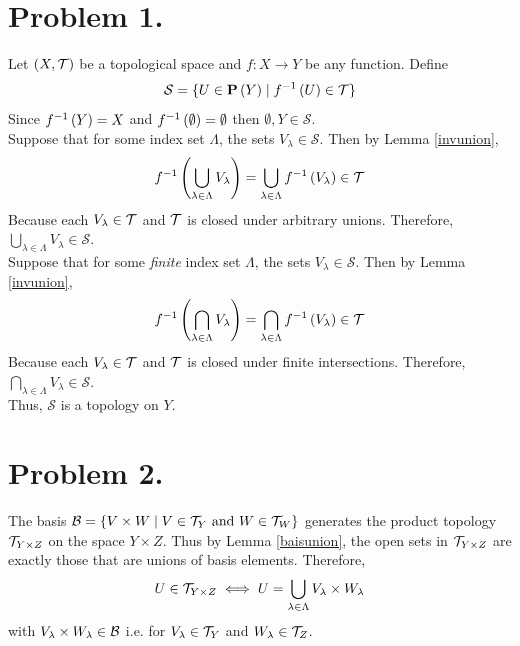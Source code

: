 \documentclass[12pt]{extarticle}
\begin{document}
 
\section*{Problem 1.}
Let $(X, \mathcal{T})$ be a topological space and $f : X \rightarrow Y$ be any function. Define \[\mathcal{S} = \{ U \in \mathbf{P}\left(Y\right) \mid f^{-1} \left( U \right) \in \mathcal{T} \}\]
Since $f^{-1} \left( Y \right) = X$ and $f^{-1} \left( \emptyset \right) = \emptyset$ then $\emptyset, Y \in \mathcal{S}$. \\ \smallskip
Suppose that for some index set $\Lambda$, the sets $V_\lambda \in \mathcal{S}$. Then by Lemma \ref{invunion}, \[f^{-1} \left( \bigcup_{\lambda \in \Lambda} V_\lambda \right) = \bigcup_{\lambda \in \Lambda} f^{-1} \left( V_\lambda \right) \in \mathcal{T}\]
Because each $V_\lambda \in \mathcal{T}$ and $\mathcal{T}$ is closed under arbitrary unions. Therefore, $\bigcup\limits_{\lambda \in \Lambda} V_\lambda \in \mathcal{S}$. \\
Suppose that for some \emph{finite} index set $\Lambda$, the sets $V_\lambda \in \mathcal{S}$. Then by Lemma \ref{invunion}, \[f^{-1} \left( \bigcap_{\lambda \in \Lambda} V_\lambda \right) = \bigcap_{\lambda \in \Lambda} f^{-1} \left( V_\lambda \right) \in \mathcal{T}\]
Because each $V_\lambda \in \mathcal{T}$ and $\mathcal{T}$ is closed under finite intersections. Therefore, $\bigcap\limits_{\lambda \in \Lambda} V_\lambda \in \mathcal{S}$. \\
Thus, $\mathcal{S}$ is a topology on $Y$. 

\section*{Problem 2.}
The basis $\mathcal{B} = \{V \times W \mid V \in \mathcal{T}_Y \text{ and } W \in \mathcal{T}_W \}$ generates the product topology $\mathcal{T}_{Y \times Z}$ on the space $Y \times Z$. Thus by Lemma \ref{baisunion}, the open sets in $\mathcal{T}_{Y \times Z}$ are exactly those that are unions of basis elements. Therefore, \[U \in \mathcal{T}_{Y \times Z} \iff U = \bigcup\limits_{\lambda \in \Lambda} V_\lambda \times W_\lambda\] 
with $V_\lambda \times W_\lambda \in \mathcal{B}$ i.e. for $V_\lambda \in \mathcal{T}_Y$ and $W_\lambda \in \mathcal{T}_Z$.
\end{document}
